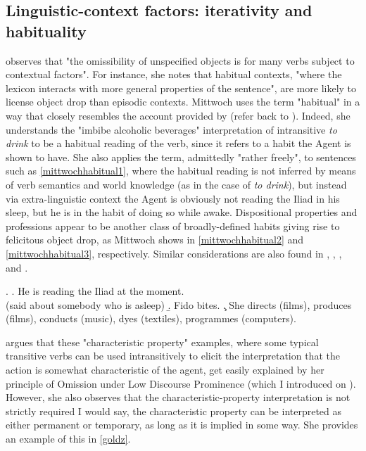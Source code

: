 \subsection{Linguistic-context factors: iterativity and habituality} 

\textcite[237]{Mittwoch2005} observes that "the omissibility of unspecified objects is for many verbs subject to contextual factors". For instance, she notes that habitual contexts, "where the lexicon interacts with more general properties of the sentence", are more likely to license object drop than episodic contexts. Mittwoch uses the term "habitual" in a way that closely resembles the account provided by \textcite{Glass2020} (refer back to ). Indeed, she understands the "imbibe alcoholic beverages" interpretation of intransitive \textit{to drink} to be a habitual reading of the verb, since it refers to a habit the Agent is shown to have. She also applies the term, admittedly "rather freely", to sentences such as \ref{mittwochhabitual1}, where the habitual reading is not inferred by means of verb semantics and world knowledge (as in the case of \textit{to drink}), but instead via extra-linguistic context \textemdash the Agent is obviously not reading the Iliad in his sleep, but he is in the habit of doing so while awake. Dispositional properties and professions appear to be another class of broadly-defined habits giving rise to felicitous object drop, as Mittwoch shows in \ref{mittwochhabitual2} and \ref{mittwochhabitual3}, respectively. Similar considerations are also found in \textcite{FellbaumKegl1989taxonomic}, \textcite[39]{Levin1993}, \textcite[518]{Goldberg2001}, and \textcite[29]{PethoKardos2006}.

\ex. \label{mittwochhabitualA} \a. \label{mittwochhabitual1} He is reading the Iliad at the moment. \\ (said about somebody who is asleep)
\b. \label{mittwochhabitual2} Fido bites.
\c. \label{mittwochhabitual3} She directs (films), produces (films), conducts (music), dyes (textiles), programmes (computers).

\textcite[518]{Goldberg2001} argues that these "characteristic property" examples, where some typical transitive verbs can be used intransitively to elicit the interpretation that the action is somewhat characteristic of the agent, get easily explained by her principle of Omission under Low Discourse Prominence (which I introduced on ). However, she also observes that the characteristic-property interpretation is not strictly required \textemdash I would say, the characteristic property can be interpreted as either permanent or temporary, as long as it is implied in some way. She provides an example of this in \ref{goldz}.

